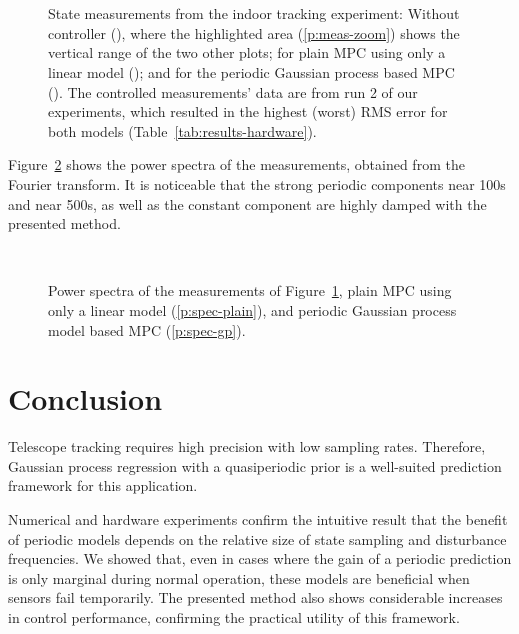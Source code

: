 \begin{figure}
\centering
\footnotesize
{}\\
\\
\caption[State measurements from the indoor tracking experiment.]{State
measurements from the indoor tracking experiment: Without controller
(), where the highlighted
area (\ref*{p:meas-zoom}) shows the vertical range of the two other plots; for
plain MPC using only a linear model (); and for the
periodic Gaussian process based MPC (). The controlled
measurements' data are from run 2 of our experiments, which resulted in the
highest (worst) RMS error for both models (Table~\ref{tab:results-hardware}). }
\label{fig:hardware_measurement}
\end{figure}

Figure~\ref{fig:spectra} shows the power spectra of the measurements,
obtained from the Fourier transform. It is noticeable that the strong periodic
components near 100\unit{s} and near 500\unit{s}, as well as the constant
component are highly damped with the presented method.

\begin{figure}
\centering
\footnotesize
{}\\
\caption[Power spectra from the indoor tracking experiment.]{Power spectra of
the measurements of Figure~\ref{fig:hardware_measurement}, plain MPC using only
a linear model (\ref*{p:spec-plain}), and periodic Gaussian process model based
MPC (\ref*{p:spec-gp}).} \label{fig:spectra}
\end{figure}


\section{Conclusion}

Telescope tracking requires high precision with low sampling rates. Therefore,
Gaussian process regression with a quasiperiodic prior is a well-suited
prediction framework for this application.

Numerical and hardware experiments confirm the intuitive result that the benefit
of periodic models depends on the relative size of state sampling and
disturbance frequencies. We showed that, even in cases where the gain of a
periodic prediction is only marginal during normal operation, these models are
beneficial when sensors fail temporarily. The presented method also shows
considerable increases in control performance, confirming the practical utility
of this framework.
